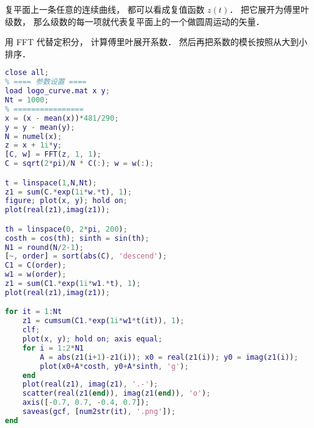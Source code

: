 
\begin{issues}
\issueDraft
\end{issues}


复平面上一条任意的连续曲线， 都可以看成复值函数 $z(t)$． 把它展开为傅里叶级数， 那么级数的每一项就代表复平面上的一个做圆周运动的矢量．

用 FFT 代替定积分， 计算傅里叶展开系数． 然后再把系数的模长按照从大到小排序．

\begin{lstlisting}[language=matlab, caption=FFTplt]
close all;
% ==== 参数设置 ====
load logo_curve.mat x y;
Nt = 1000;
% ================
x = (x - mean(x))*481/290;
y = y - mean(y);
N = numel(x);
z = x + 1i*y;
[C, w] = FFT(z, 1, 1);
C = sqrt(2*pi)/N * C(:); w = w(:);

t = linspace(1,N,Nt);
z1 = sum(C.*exp(1i*w.*t), 1);
figure; plot(x, y); hold on;
plot(real(z1),imag(z1));

th = linspace(0, 2*pi, 200);
costh = cos(th); sinth = sin(th);
N1 = round(N/2-1);
[~, order] = sort(abs(C), 'descend');
C1 = C(order);
w1 = w(order);
z1 = sum(C1.*exp(1i*w1.*t), 1);
plot(real(z1),imag(z1));

for it = 1:Nt
    z1 = cumsum(C1.*exp(1i*w1*t(it)), 1);
    clf;
    plot(x, y); hold on; axis equal;
    for i = 1:2*N1
        A = abs(z1(i+1)-z1(i)); x0 = real(z1(i)); y0 = imag(z1(i));
        plot(x0+A*costh, y0+A*sinth, 'g');
    end
    plot(real(z1), imag(z1), '.-');
    scatter(real(z1(end)), imag(z1(end)), 'o');
    axis([-0.7, 0.7, -0.4, 0.7]);
    saveas(gcf, [num2str(it), '.png']);
end
\end{lstlisting}
